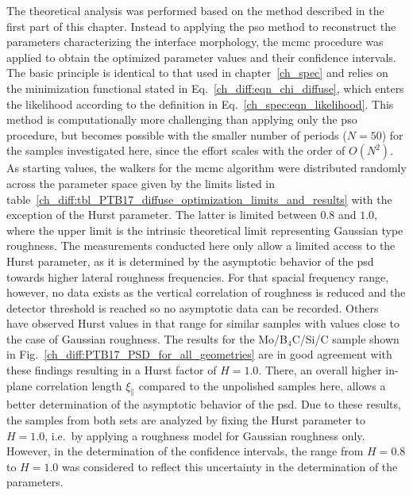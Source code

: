 The theoretical analysis was performed based on the method described in the first part of this chapter. Instead to applying the \gls{pso} method to reconstruct the parameters characterizing the interface morphology, the \gls{mcmc} procedure was applied to obtain the optimized parameter values and their confidence intervals. The basic principle is identical to that used in chapter~\ref{ch_spec} and relies on the minimization functional stated in Eq.~\eqref{ch_diff:eqn_chi_diffuse}, which enters the likelihood according to the definition in Eq.~\eqref{ch_spec:eqn_likelihood}. This method is computationally more challenging than applying only the \gls{pso} procedure, but becomes possible with the smaller number of periods ($N=50$) for the samples investigated here, since the effort scales with the order of $O(N^2)$. As starting values, the walkers for the \gls{mcmc} algorithm were distributed randomly across the parameter space given by the limits listed in table~\ref{ch_diff:tbl_PTB17_diffuse_optimization_limits_and_results} with the exception of the Hurst parameter. The latter is limited between $0.8$ and $1.0$, where the upper limit is the intrinsic theoretical limit representing Gaussian type roughness. The measurements conducted here only allow a limited access to the Hurst parameter, as it is determined by the asymptotic behavior of the \gls{psd} towards higher lateral roughness frequencies. For that spacial frequency range, however, no data exists as the vertical correlation of roughness is reduced and the detector threshold is reached so no asymptotic data can be recorded. Others~\cite{rack_comparative_2010} have observed Hurst values in that range for similar samples with values close to the case of Gaussian roughness. The results for the Mo/B$_4$C/Si/C sample shown in Fig.~\ref{ch_diff:PTB17_PSD_for_all_geometries} are in good agreement with these findings resulting in a Hurst factor of $H=1.0$. There, an overall higher in-plane correlation length $\xi_\parallel$ compared to the unpolished samples here, allows a better determination of the asymptotic behavior of the \gls{psd}. Due to these results, the samples from both sets are analyzed by fixing the Hurst parameter to $H=1.0$, i.e.~by applying a roughness model for Gaussian roughness only. However, in the determination of the confidence intervals, the range from $H=0.8$ to $H=1.0$ was considered to reflect this uncertainty in the determination of the parameters. 

